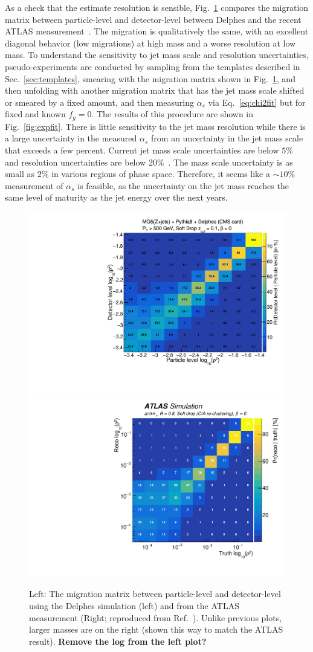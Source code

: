 As a check that the estimate resolution is sensible,
Fig.~\ref{fig:expres} compares the migration matrix between
particle-level and detector-level between Delphes and the recent ATLAS
measurement~\cite{Aaboud:2017qwh}.  The migration is qualitatively the
same, with an excellent diagonal behavior (low migrations) at high
mass and a worse resolution at low mass.  To understand the
sensitivity to jet mass scale and resolution uncertainties,
pseudo-experiments are conducted by sampling from the templates
described in Sec.~\ref{sec:templates}, smearing with the migration
matrix shown in Fig.~\ref{fig:expres},  and then unfolding with another migration matrix that has the jet mass scale shifted or smeared by a fixed amount, and then measuring $\alpha_s$ via Eq.~\ref{eq:chi2fit} but for fixed and known $f_g=0$.  The results of this procedure are shown in Fig.~\ref{fig:expfit}.  There is little sensitivity to the jet mass resolution while there is a large uncertainty in the measured $\alpha_s$ from an uncertainty in the jet mass scale that exceeds a few percent.  Current jet mass scale uncertainties are below $5\%$ and resolution uncertainties are below 20\%~\cite{}.  The mass scale uncertainty is as small as $2\%$ in various regions of phase space.  Therefore, it seems like a $\sim 10\%$ measurement of $\alpha_s$ is feasible, as the uncertainty on the jet mass reaches the same level of maturity as the jet energy over the next years.

\begin{figure}[h!]
\begin{center}
\includegraphics[width = 0.49\columnwidth]{figures/experimentaldemo/Rho_2D.pdf}\includegraphics[width = 0.49\columnwidth]{figures/figaux_03a.pdf}
\end{center}
\caption{Left: The migration matrix between particle-level and detector-level using the Delphes simulation (left) and from the ATLAS measurement (Right; reproduced from Ref.~\cite{Aaboud:2017qwh}).  Unlike previous plots, larger masses are on the right (shown this way to match the ATLAS result). \textbf{Remove the log from the left plot?}}
\label{fig:expres}
\end{figure}

